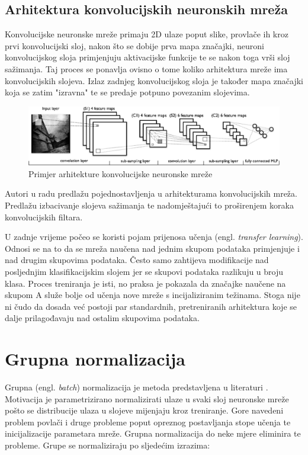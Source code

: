 \documentclass[times, utf8, diplomski]{fer}
\begin{document}
\subsection{Arhitektura konvolucijskih neuronskih mreža}
Konvolucijske neuronske mreže primaju 2D ulaze poput slike, provlače ih kroz prvi konvolucijski sloj, nakon što se dobije prva mapa značajki, neuroni konvolucijskog sloja primjenjuju aktivacijske funkcije te se nakon toga vrši sloj sažimanja. Taj proces se ponavlja ovisno o tome koliko arhitektura mreže ima konvolucijskih slojeva. Izlaz zadnjeg konvolucijskog sloja je također mapa značajki koja se zatim "izravna" te se predaje potpuno povezanim slojevima. \par

\begin{figure}[htbp]
    \centering
    \includegraphics[scale=0.75]{Slike/mylenet}
    \caption{Primjer arhitekture konvolucijske neuronske mreže \cite{mylenet}}
\end{figure}

Autori u radu \cite{striving} predlažu pojednostavljenja u arhitekturama konvolucijskih mreža. Predlažu izbacivanje slojeva sažimanja te nadomještajući to proširenjem koraka konvolucijskih filtara. \par

U zadnje vrijeme počeo se koristi pojam prijenosa učenja (engl. \textit{transfer learning}). Odnosi se na to da se mreža naučena nad jednim skupom podataka primjenjuje i nad drugim skupovima podataka. Često samo zahtijeva modifikacije nad posljednjim klasifikacijskim slojem jer se skupovi podataka razlikuju u broju klasa. Proces treniranja je isti, no praksa je pokazala da značajke naučene na skupom A služe bolje od učenja nove mreže s incijaliziranim težinama. Stoga nije ni čudo da dosada već postoji par standardnih, pretreniranih arhitektura koje se dalje prilagođavaju nad ostalim skupovima podataka.

\pagebreak

\section{Grupna normalizacija}
Grupna (engl. \textit{batch}) normalizacija je metoda predstavljena u literaturi \cite{batchnorm}. Motivacija je parametrizirano normalizirati ulaze u svaki sloj neuronske mreže pošto se distribucije ulaza u slojeve mijenjaju kroz treniranje. Gore navedeni problem povlači i druge probleme poput opreznog postavljanja stope učenja te inicijalizacije parametara mreže. Grupna normalizacija do neke mjere eliminira te probleme. Grupe se normaliziraju po sljedećim izrazima:
\end{document}
